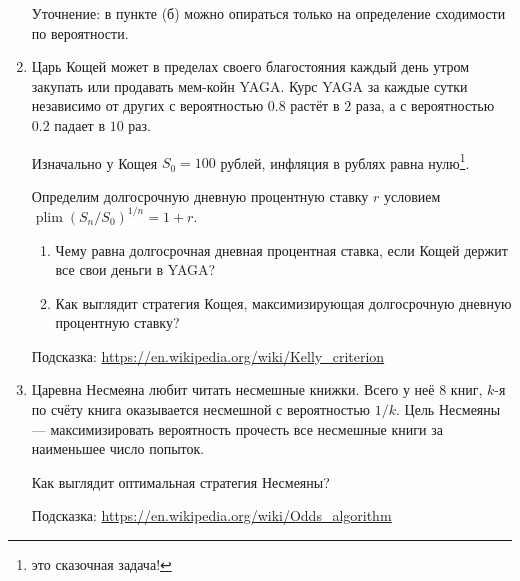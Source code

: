 \documentclass[12pt]{article}
\DeclareMathOperator{\plim}{plim}
\begin{document}
\begin{enumerate}
    Уточнение: в пункте (б) можно опираться только на определение сходимости по вероятности. 

    \item Царь Кощей может в пределах своего благостояния каждый день утром закупать или продавать мем-койн YAGA. 
    Курс YAGA за каждые сутки независимо от других с вероятностью $0.8$ растёт в $2$ раза, а с вероятностью $0.2$ падает в $10$ раз. 
    
    Изначально у Кощея $S_0 = 100$ рублей, инфляция в рублях равна нулю\footnote{это сказочная задача!}.

    Определим долгосрочную дневную процентную ставку $r$ условием $\plim (S_n / S_0)^{1/n} = 1 + r$.

    \begin{enumerate}
        \item Чему равна долгосрочная дневная процентная ставка, если Кощей держит все свои деньги в YAGA?
        \item Как выглядит стратегия Кощея, максимизирующая долгосрочную дневную процентную ставку?
    \end{enumerate}


    Подсказка: \url{https://en.wikipedia.org/wiki/Kelly_criterion}

    \item Царевна Несмеяна любит читать несмешные книжки. 
    Всего у неё 8 книг, $k$-я по счёту книга оказывается несмешной с вероятностью $1/k$.
    Цель Несмеяны — максимизировать вероятность прочесть все несмешные книги за наименьшее число попыток. 

    Как выглядит оптимальная стратегия Несмеяны?

    Подсказка: \url{https://en.wikipedia.org/wiki/Odds_algorithm}

\end{enumerate}
\end{document}
